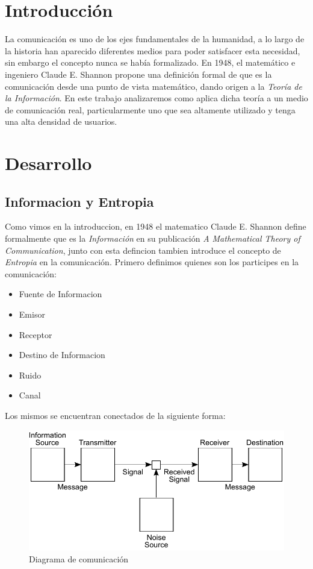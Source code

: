 \section{Introducción}

La comunicación es uno de los ejes fundamentales de la humanidad, a lo largo de la historia han aparecido diferentes medios para poder satisfacer esta necesidad, sin embargo el concepto nunca se había formalizado. En 1948, el matemático e ingeniero Claude E. Shannon propone una definición formal de que es la comunicación desde una punto de vista matemático, dando origen a la \textit{Teoría de la Información}. En este trabajo analizaremos como aplica dicha teoría a un medio de comunicación real, particularmente uno que sea altamente utilizado y tenga una alta densidad de usuarios.

\section{Desarrollo}

\subsection{Informacion y Entropia}

Como vimos en la introduccion, en 1948 el matematico Claude E. Shannon define formalmente que es la \textit{Información} en su publicación \textit{A Mathematical Theory of Communication}, junto con esta defincion tambien introduce el concepto de \textit{Entropia} en la comunicación. Primero definimos quienes son los participes en la comunicación:

\begin{itemize}
	\item Fuente de Informacion
	\item Emisor
	\item Receptor
	\item Destino de Informacion
	\item Ruido
	\item Canal
\end{itemize}

Los mismos se encuentran conectados de la siguiente forma:

\begin{figure}[ht]
\begin{center}
\includegraphics[width=0.6\columnwidth]{graficos/Shannon.pdf}
\caption{Diagrama de comunicación}
\end{center}
\end{figure}

